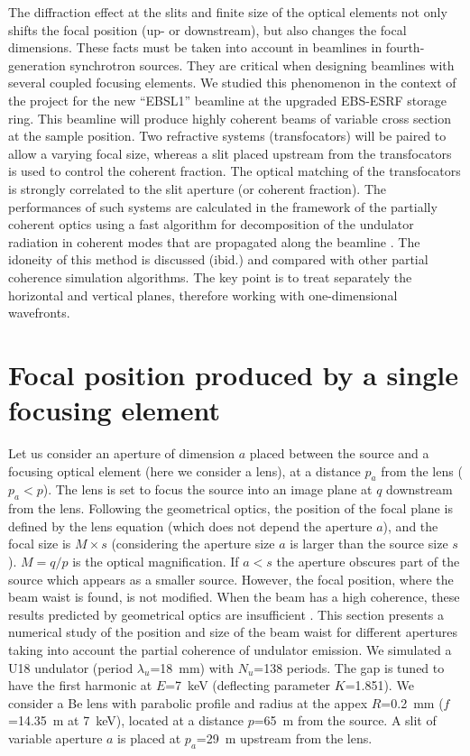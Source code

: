 \documentclass[9pt,twocolumn,twoside]{osajnl}
\begin{document}
The diffraction effect at the slits and finite size of the optical elements not only shifts the focal position (up- or downstream), but also changes the focal dimensions. These facts must be taken into account in beamlines in fourth-generation synchrotron sources. They are critical when designing beamlines with several coupled focusing elements. We studied this phenomenon in the context of the project for the new ``EBSL1'' beamline at the upgraded EBS-ESRF storage ring. This beamline will produce highly coherent beams of variable cross section at the sample position. Two refractive systems (transfocators) will be paired to allow a varying focal size, whereas a slit placed upstream from the transfocators is used to control the coherent fraction. The optical matching of the transfocators is strongly correlated to the slit aperture (or coherent fraction). The performances of such systems are calculated in the framework of the partially coherent optics using a fast algorithm for decomposition of the undulator radiation in coherent modes that are propagated along the beamline \cite{delrio2021pairing}. The idoneity of this method is discussed (ibid.) and compared with other partial coherence simulation algorithms. The key point is to treat separately the horizontal and vertical planes, therefore working with one-dimensional wavefronts.

\section{Focal position produced by a single focusing element}
\label{sec:onelens}

Let us consider an aperture of dimension $a$ placed between the source and a focusing optical element (here we consider a lens), at a distance $p_a$ from the lens ($p_a < p$). The lens is set to focus the source into an image plane at $q$ downstream from the lens. Following the geometrical optics, the position of the focal plane is defined by the lens equation (which does not depend the aperture $a$), and the focal size is $M \times s$  (considering the aperture size $a$ is larger than the source size $s$). $M = q/p$ is the optical magnification. If $a<s$ the aperture obscures part of the source which appears as a smaller source. However, the focal position, where the beam waist is found, is not modified. When the beam has a high coherence, these results predicted by geometrical optics are insufficient \cite{hierarchical}. This section presents a numerical study of the position and size of the beam waist for different apertures taking into account the partial coherence of undulator emission. We simulated a U18 undulator (period $\lambda_u$=\SI{18}{\milli\meter}) with $N_u$=138 periods. The gap is tuned to have the first harmonic at $E$=7~keV (deflecting parameter $K$=1.851). We consider a Be lens with parabolic profile and radius at the appex $R$=\SI{0.2}{\milli\meter} ($f$=\SI{14.35}{\meter} at 7~keV), located at a distance $p$=\SI{65}{\meter} from the source. A slit of variable aperture $a$ is placed at $p_a$=\SI{29}{\meter} upstream from the lens. 
\end{document}
